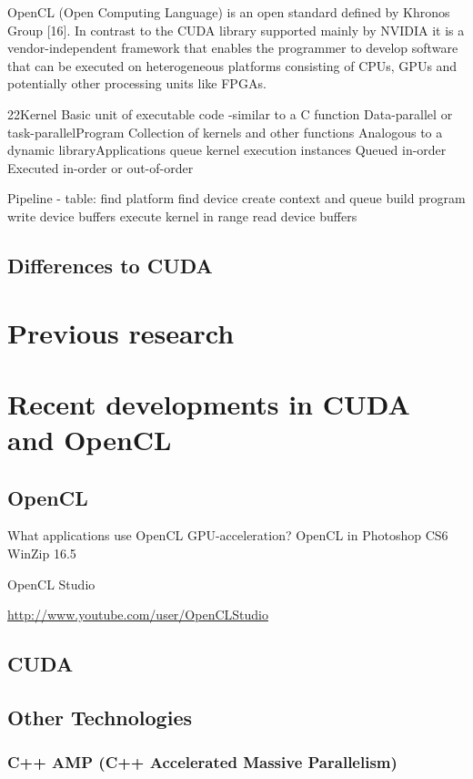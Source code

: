 OpenCL (Open Computing Language) is an open
standard defined by Khronos Group [16]. In contrast
to the CUDA library supported mainly by NVIDIA
it is a vendor-independent framework that enables
the programmer to develop software that can be executed
on heterogeneous platforms consisting of CPUs,
GPUs and potentially other processing units like FPGAs.

22Kernel
Basic unit of executable code -similar to a C function
Data-parallel or task-parallelProgram
Collection of kernels and other functions
Analogous to a dynamic libraryApplications queue kernel execution instances
Queued in-order
Executed in-order or out-of-order

Pipeline - table:
find platform
find device
create context and queue
build program
write device buffers
execute kernel in range
read device buffers


\subsection{Differences to CUDA}

\section{Previous research}



\section{Recent developments in CUDA and OpenCL}
\subsection{OpenCL}

What applications use OpenCL GPU-acceleration?
OpenCL in Photoshop CS6
WinZip 16.5

OpenCL Studio

\hyperref[OpenCLStudio]{http://www.youtube.com/user/OpenCLStudio}

\subsection{CUDA}

\subsection{Other Technologies}
\subsubsection{C++ AMP (C++ Accelerated Massive Parallelism)}

